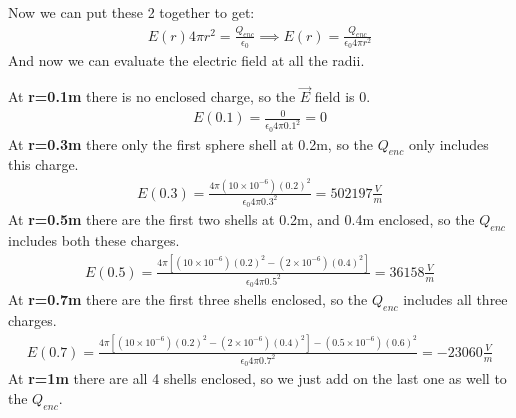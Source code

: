 \documentclass[12pt,letterpaper]{article} \usepackage{amsmath} \usepackage{graphicx} \usepackage[margin=1in]{geometry} \usepackage{longtable}  \usepackage{amssymb}
\begin{document}
\begin{mdframed}
		Now we can put these 2 together to get:
		\begin{align*}
			E(r) 4\pi r^2 = \frac{Q_{enc}}{\epsilon_0} \implies E(r) = \frac{Q_{enc}}{\epsilon_0 4\pi r^2}
		\end{align*}
		And now we can evaluate the electric field at all the radii. 
		
		At \textbf{r=0.1m} there is no enclosed charge, so the $\vec E$ field is 0. 
		\begin{align*}
			E(0.1) = \frac{0}{\epsilon_0 4\pi 0.1^2} = 0
		\end{align*}
		At \textbf{r=0.3m} there only the first sphere shell at 0.2m, so the $Q_{enc}$ only includes this charge. 
		\begin{align*}
			E(0.3) = \frac{4\pi (10\times 10^{-6})(0.2)^2 }{\epsilon_0 4\pi 0.3^2} = 502197 \frac{V}{m}
		\end{align*}
		At \textbf{r=0.5m} there are the first two shells at 0.2m, and 0.4m enclosed, so the $Q_{enc}$ includes both these charges. 
		\begin{align*}
			E(0.5) = \frac{4\pi [(10\times 10^{-6})(0.2)^2 -(2\times 10^{-6})(0.4)^2]}{\epsilon_0 4\pi 0.5^2} = 36158\frac{V}{m}
		\end{align*}
		At \textbf{r=0.7m} there are the first three shells enclosed, so the $Q_{enc}$ includes all three charges. 
		\begin{align*}
			E(0.7) = \frac{4\pi [(10\times 10^{-6})(0.2)^2 -(2\times 10^{-6})(0.4)^2] - (0.5\times 10^{-6})(0.6)^2}{\epsilon_0 4\pi 0.7^2} = -23060 \frac{V}{m}
		\end{align*}
		At \textbf{r=1m} there are all 4 shells enclosed, so we just add on the last one as well to the $Q_{enc}$. 
		
	\end{mdframed}
\end{document}
